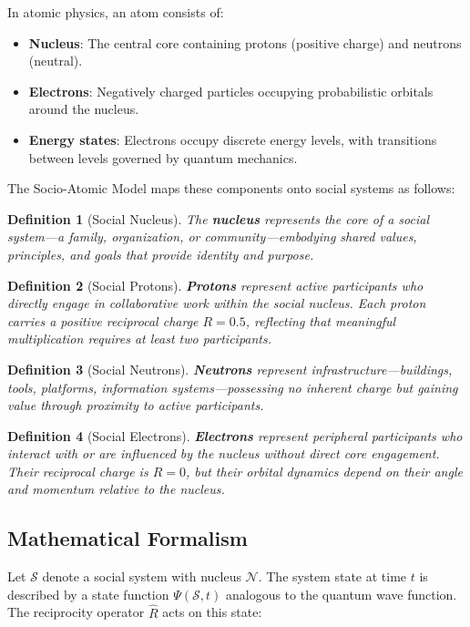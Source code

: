 \documentclass[11pt,a4paper]{article}
\newtheorem{definition}{Definition}
\begin{document}
In atomic physics, an atom consists of:
\begin{itemize}
    \item \textbf{Nucleus}: The central core containing protons (positive charge) and neutrons (neutral).
    \item \textbf{Electrons}: Negatively charged particles occupying probabilistic orbitals around the nucleus.
    \item \textbf{Energy states}: Electrons occupy discrete energy levels, with transitions between levels governed by quantum mechanics.
\end{itemize}

The Socio-Atomic Model maps these components onto social systems as follows:

\begin{definition}[Social Nucleus]
The \textbf{nucleus} represents the core of a social system—a family, organization, or community—embodying shared values, principles, and goals that provide identity and purpose.
\end{definition}

\begin{definition}[Social Protons]
\textbf{Protons} represent active participants who directly engage in collaborative work within the social nucleus. Each proton carries a positive reciprocal charge $R = 0.5$, reflecting that meaningful multiplication requires at least two participants.
\end{definition}

\begin{definition}[Social Neutrons]
\textbf{Neutrons} represent infrastructure—buildings, tools, platforms, information systems—possessing no inherent charge but gaining value through proximity to active participants.
\end{definition}

\begin{definition}[Social Electrons]
\textbf{Electrons} represent peripheral participants who interact with or are influenced by the nucleus without direct core engagement. Their reciprocal charge is $R = 0$, but their orbital dynamics depend on their angle and momentum relative to the nucleus.
\end{definition}

\subsection{Mathematical Formalism}

Let $\mathcal{S}$ denote a social system with nucleus $\mathcal{N}$. The system state at time $t$ is described by a state function $\Psi(\mathcal{S}, t)$ analogous to the quantum wave function. The reciprocity operator $\hat{R}$ acts on this state:
\end{document}

